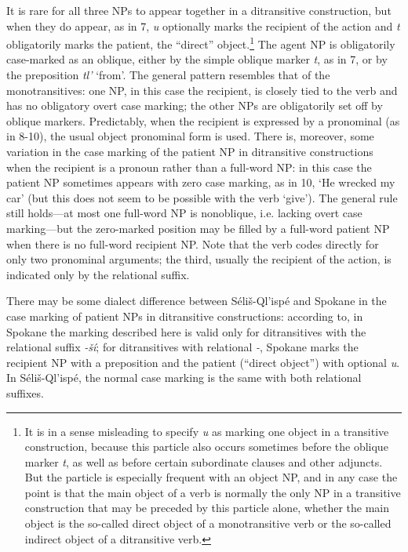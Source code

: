 \documentclass[output=paper,colorlinks,citecolor=brown]{langscibook}
\begin{document}
  It is rare for all three NPs to appear together in a ditransitive
  construction, but when they do appear, as in 7, \emph{{\textltilde}u} optionally marks the recipient of the action and
  \emph{t} obligatorily marks the patient, the ``direct''
  object.\footnote{It is in a sense misleading to specify \emph{{\textltilde}u} as marking one object in a transitive
  construction, because this particle also occurs sometimes before
  the oblique marker \emph{t}, as well as before certain subordinate
  clauses and other adjuncts.  But the particle is especially
  frequent with an object NP, and in any case the point is that the
  main object of a verb is normally the only NP in a transitive
  construction that may be preceded by this particle alone, whether
  the main object is the so-called direct object of a monotransitive
  verb or the so-called indirect object of a ditransitive verb.  }
  The agent NP is obligatorily case-marked as an oblique, either by
  the simple oblique marker \emph{t}, as in 7, or by the preposition
  \emph{tl'} `from'.  The general pattern resembles that of the
  monotransitives: one NP, in this case the recipient, is closely
  tied to the verb and has no obligatory overt case marking; the
  other NPs are obligatorily set off by oblique markers.
  Predictably, when the recipient is expressed by a pronominal (as in
  8-10), the usual object pronominal form is used.  There is,
  moreover, some variation in the case marking of the patient NP in
  ditransitive constructions when the recipient is a pronoun rather
  than a full-word NP: in this case the patient NP sometimes appears
  with zero case marking, as in 10, `He wrecked my car' (but this
  does not seem to be possible with the verb `give').  The general
  rule still holds---at most one full-word NP is nonoblique, i.e.
  lacking overt case marking---but the zero-marked position may be
  filled by a full-word patient NP when there is no full-word
  recipient NP.  Note that the verb codes directly for only two
  pronominal arguments; the third, usually the recipient of the
  action, is indicated only by the relational suffix.

  \medskip

  There may be some dialect difference between S\'eli\v{s}-Ql'isp\'e
  and Spokane in the case marking of patient NPs in ditransitive
  constructions: according to\newline \cite[24]{Carlson:1980}, in Spokane the
  marking described here is valid only for ditransitives with the
  relational suffix \emph{-\v{s}\'i}; for ditransitives with
  relational \emph{-{\textltilde}}, Spokane marks the recipient NP
  with a preposition and the patient (``direct object'') with
  optional \emph{{\textltilde}u}.  In S\'eli\v{s}-Ql'isp\'e, the
  normal case marking is the same with both relational suffixes.
\end{document}
